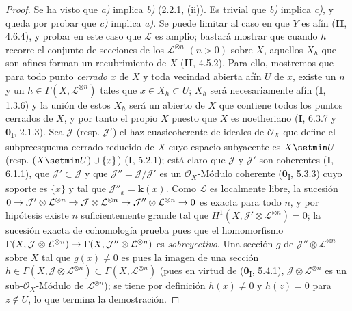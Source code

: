 \documentclass[10pt,oneside,openany]{book}
\theoremstyle{egaenv}\newtheorem*{env}{---}
\theoremstyle{egastatement}
\theoremstyle{egadescription}
\newcommand{\oldpage}[2][]{\marginnote{\normalfont\scriptsize\textbf{#1}\,|\,#2}\ignorespaces}
\renewcommand{\to}{\mathchoice{\longrightarrow}{\rightarrow}{\rightarrow}{\rightarrow}}
\begin{document}
\begin{proof}
Se ha visto que \emph{a)} implica \emph{b)} (\hyperref[III.2.2.1-fr]{2.2.1}, (ii)). Es
trivial que \emph{b)} implica \emph{c)}, y queda por probar que \emph{c)} implica
\emph{a)}. Se puede limitar al caso en que $Y$ es afín (\textbf{II}, 4.6.4), y probar
en este caso que $\mathcal L$ es amplio; bastará mostrar que cuando
$h$ recorre el conjunto de secciones de los $\mathcal L^{\otimes n}$
$(n>0)$ sobre $X$, aquellos $X_h$ que son afines forman un
recubrimiento de $X$ (\textbf{II}, 4.5.2). Para ello, mostremos que para todo punto
\emph{cerrado} $x$ de $X$ y toda vecindad abierta afín $U$ de $x$, existe un
$n$ y un $h\in\Gamma(X,\mathcal L^{\otimes n})$ tales que
$x\in X_h\subset U$; $X_h$ será necesariamente afín (\textbf{I}, 1.3.6) y la
unión de estos $X_h$ será un abierto de $X$ que contiene todos los puntos
cerrados de $X$, y por tanto el propio $X$ puesto que $X$ es noetheriano
(\textbf{I}, 6.3.7 y \textbf{0}\textsubscript{I}, 2.1.3). Sea $\mathcal J$ (resp.
$\mathcal J'$) el haz cuasicoherente de ideales de $\mathcal O_X$
que define el subpreesquema cerrado reducido de $X$ cuyo espacio
subyacente es $X\setmin U$ (resp. $(X\setmin U)\cup\{x\}$) (\textbf{I}, 5.2.1); está claro que
$\mathcal J$ y $\mathcal J'$ son coherentes (\textbf{I}, 6.1.1), que
$\mathcal J'\subset\mathcal J$ y que
$\mathcal J''=\mathcal J/\mathcal J'$ es un $\mathcal O_X$-Módulo
coherente (\textbf{0}\textsubscript{I}, 5.3.3) cuyo soporte es $\{x\}$ y tal
que $\mathcal J''_x=\boldsymbol{k}(x)$. Como $\mathcal L$ es localmente libre, la
sucesión
$0\to\mathcal J'\otimes\mathcal L^{\otimes n}
\to\mathcal J\otimes\mathcal L^{\otimes n}
\to\mathcal J''\otimes\mathcal L^{\otimes n}\to0$
es exacta para todo $n$, y por hipótesis existe $n$ suficientemente grande tal
que $H^1(X,\mathcal J'\otimes\mathcal L^{\otimes n})=0$; la sucesión
exacta de cohomología
\oldpage[III]{112}
prueba pues que el homomorfismo
$\Gamma(X,\mathcal J\otimes\mathcal L^{\otimes n})
\to
\Gamma(X,\mathcal J''\otimes\mathcal L^{\otimes n})$
es \emph{sobreyectivo}. Una sección $g$ de
$\mathcal J''\otimes\mathcal L^{\otimes n}$ sobre $X$ tal que
$g(x)\neq0$ es pues la imagen de una sección
$h\in\Gamma(X,\mathcal J\otimes\mathcal L^{\otimes n})
\subset\Gamma(X,\mathcal L^{\otimes n})$ (pues en virtud de
(\textbf{0}\textsubscript{I}, 5.4.1),
$\mathcal J\otimes\mathcal L^{\otimes n}$ es un sub-$\mathcal O_X$-Módulo
de $\mathcal L^{\otimes n}$); se tiene por definición $h(x)\neq0$ y
$h(z)=0$ para $z\notin U$, lo que termina la demostración.
\end{proof}
\end{document}
